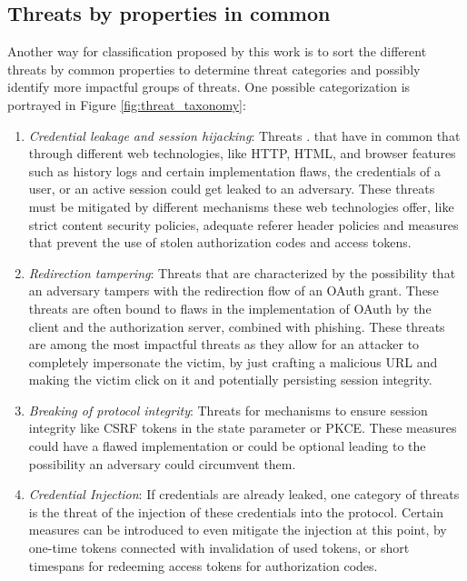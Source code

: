 \subsection{Threats by properties in common}
Another way for classification proposed by this work is to sort the different threats by common properties to determine threat categories and possibly identify more impactful groups of threats. One possible categorization is portrayed in Figure \ref{fig:threat_taxonomy}:
\begin{enumerate}
	\item \emph{Credential leakage and session hijacking}: Threats . that have in common that through different web technologies, like HTTP, HTML, and browser features such as history logs and certain implementation flaws, the credentials of a user, or an active session could get leaked to an adversary. These threats must be mitigated by different mechanisms these web technologies offer, like strict content security policies, adequate referer header policies and measures that prevent the use of stolen authorization codes and access tokens. 
	\item \emph{Redirection tampering}: Threats that are characterized by the possibility that an adversary tampers with the redirection flow of an OAuth grant. These threats are often bound to flaws in the implementation of OAuth by the client and the authorization server, combined with phishing. These threats are among the most impactful threats as they allow for an attacker to completely impersonate the victim, by just crafting a malicious URL and making the victim click on it and potentially persisting session integrity.
	\item \emph{Breaking of protocol integrity}: Threats for mechanisms to ensure session integrity like CSRF tokens in the state parameter or PKCE. These measures could have a flawed implementation or could be optional leading to the possibility an adversary could circumvent them.
	\item \emph{Credential Injection}: If credentials are already leaked, one category of threats is the threat of the injection of these credentials into the protocol. Certain measures can be introduced to even mitigate the injection at this point, by one-time tokens connected with invalidation of used tokens, or short timespans for redeeming access tokens for authorization codes.
\end{enumerate}

